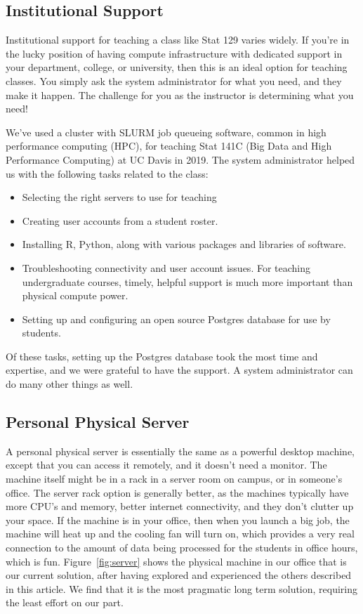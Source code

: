 \documentclass[12pt]{article}
\begin{document}
\subsection{Institutional Support}

Institutional support for teaching a class like Stat 129 varies widely.
If you're in the lucky position of having compute infrastructure with dedicated support in your department, college, or university, then this is an ideal option for teaching classes.
You simply ask the system administrator for what you need, and they make it happen.
The challenge for you as the instructor is determining what you need!

We've used a cluster with SLURM \cite{yoo2003slurm} job queueing software, common in high performance computing (HPC), for teaching Stat 141C (Big Data and High Performance Computing) at UC Davis in 2019.
The system administrator helped us with the following tasks related to the class:
\begin{itemize}
\item Selecting the right servers to use for teaching
\item Creating user accounts from a student roster.
\item Installing R, Python, along with various packages and libraries of software.
\item Troubleshooting connectivity and user account issues.
    For teaching undergraduate courses, timely, helpful support is much more important than physical compute power.
\item Setting up and configuring an open source Postgres database for use by students.
\end{itemize}
Of these tasks, setting up the Postgres database took the most time and expertise, and we were grateful to have the support.
A system administrator can do many other things as well.


\subsection{Personal Physical Server}

A personal physical server is essentially the same as a powerful desktop machine, except that you can access it remotely, and it doesn't need a monitor.
The machine itself might be in a rack in a server room on campus, or in someone's office.
The server rack option is generally better, as the machines typically have more CPU's and memory, better internet connectivity, and they don't clutter up your space.
If the machine is in your office, then when you launch a big job, the machine will heat up and the cooling fan will turn on, which provides a very real connection to the amount of data being processed for the students in office hours, which is fun.
Figure~\ref{fig:server} shows the physical machine in our office that is our current solution, after having explored and experienced the others described in this article.
We find that it is the most pragmatic long term solution, requiring the least effort on our part.
\end{document}
